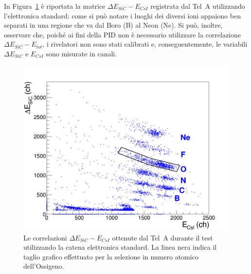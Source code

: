 
In Figura~\ref{fig:sic_csi_standard} è riportata la matrice $\Delta E_{SiC} - E_{CsI}$ registrata dal Tel~A utilizzando l'elettronica standard: come si può notare i luoghi dei diversi ioni appaiono ben separati in una regione che va dal Boro (B) al Neon (Ne).
Si può, inoltre, osservare che, poiché ai fini della PID non è necessario utilizzare la correlazione $\Delta E_{SiC} - E_{tot}$, i rivelatori non sono stati calibrati e, conseguentemente, le variabili $\Delta E_{SiC}$ e $E_{CsI}$ sono misurate in canali.


\begin{figure} [!p]
	\centering
	\includegraphics[width=\textwidth, keepaspectratio]{Grafici_Tesi/Test/matrice_sic_csi_taglio3.png}
	\caption{Le correlazioni $\Delta E_{SiC} - E_{CsI}$ ottenute dal Tel~A durante il test utilizzando la catena elettronica standard. La linea nera indica il taglio grafico effettuato per la selezione in numero atomico dell'Ossigeno.} \label{fig:sic_csi_standard}
\end{figure}





